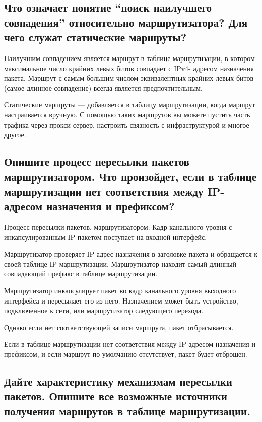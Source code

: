\subsection{Что означает понятие “поиск наилучшего совпадения” 
относительно маршрутизатора? Для чего служат статические 
маршруты?}

Наилучшим совпадением является маршрут в таблице маршрутизации, 
в котором максимальное число крайних левых битов совпадает с IPv4-
адресом назначения пакета. Маршрут с самым большим числом 
эквивалентных крайних левых битов (самое длинное совпадение) всегда 
является предпочтительным.\par
Статические маршруты --- добавляется в таблицу маршрутизации, 
когда маршрут настраивается вручную. С помощью таких маршрутов вы 
можете пустить часть трафика через прокси-сервер, настроить связность с 
инфраструктурой и многое другое.

\subsection{Опишите процесс пересылки пакетов маршрутизатором. Что 
произойдет, если в таблице маршрутизации нет соответствия 
между IP-адресом назначения и префиксом?}

Процесс пересылки пакетов, маршрутизатором:
Кадр канального уровня с инкапсулированным IP-пакетом поступает 
на входной интерфейс.\par
Маршрутизатор проверяет IP-адрес назначения в заголовке пакета и 
обращается к своей таблице IP-маршрутизации.
Маршрутизатор находит самый длинный совпадающий префикс в 
таблице маршрутизации.\par
Маршрутизатор инкапсулирует пакет во кадр канального уровня 
выходного интерфейса и пересылает его из него. Назначением может 
быть устройство, подключенное к сети, или маршрутизатор 
следующего перехода.\par
Однако если нет соответствующей записи маршрута, пакет 
отбрасывается.\par
Если в таблице маршрутизации нет соответствия между IP-адресом 
назначения и префиксом, и если маршрут по умолчанию отсутствует, пакет 
будет отброшен.\par

\subsection{Дайте характеристику механизмам пересылки пакетов. 
Опишите все возможные источники получения маршрутов в 
таблице маршрутизации.}

